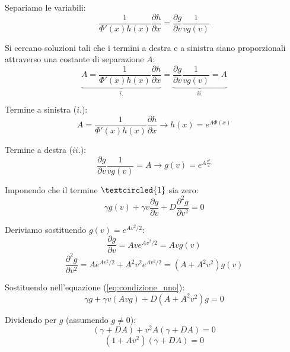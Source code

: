 Separiamo le variabili:
\begin{equation}  
\frac{1}{\Phi'(x) h(x) }\frac{\partial h}{\partial x} = \frac{\partial g}{\partial v} \frac{1}{ v g(v) }
\end{equation}

Si cercano soluzioni tali che i termini a destra e a sinistra siano proporzionali attraverso una costante di separazione $A$:
\begin{equation}  
\underbrace{A=\frac{1}{\Phi'(x) h(x) }\frac{\partial h}{\partial x}}_{i.} = \underbrace{\frac{\partial g}{\partial v} \frac{1}{ v g(v) }=A}_{ii.}
\end{equation}

Termine a sinistra ($i.$):
\begin{equation}  
A=\frac{1}{\Phi'(x) h(x) }\frac{\partial h}{\partial x} \longrightarrow h(x)= e^{A \Phi(x)}
\end{equation}

Termine a destra ($ii.$):
\begin{equation}   
\frac{\partial g}{\partial v} \frac{1}{ v g(v) } =A \longrightarrow g(v)= e^{A \frac{v^2}{2}} 
\end{equation}

Imponendo che il termine $\textcircled{1}$ sia zero:
\begin{equation}
\gamma g(v) + \gamma v \frac{\partial g}{\partial v} + D \frac{\partial^2 g}{\partial v^2} = 0
\label{eq:condizione_uno}
\end{equation}

Deriviamo sostituendo $g(v) = e^{A v^2/2}$:
\begin{equation*}
\frac{\partial g}{\partial v} = Av e^{A v^2/2} = Av g(v)
\end{equation*}
\begin{equation*}
\frac{\partial^2 g}{\partial v^2} = A e^{A v^2/2} + A^2 v^2 e^{A v^2/2} = (A + A^2 v^2) g(v)
\end{equation*}

Sostituendo nell'equazione (\ref{eq:condizione_uno}):
\begin{equation}
\gamma g + \gamma v (Av g) + D (A + A^2 v^2) g = 0
\end{equation}

Dividendo per $g$ (assumendo $g \neq 0$):
\begin{equation}
(\gamma + DA) + v^2 A(\gamma + DA) = 0
\end{equation}
\begin{equation}
(1+Av^2)(\gamma + DA) = 0
\end{equation}

